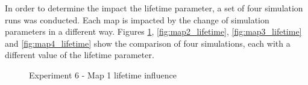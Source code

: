In order to determine the impact the lifetime parameter, a set of four simulation runs was conducted.
Each map is impacted by the change of simulation parameters in a different way.
Figures \ref{fig:map1_lifetime}, \ref{fig:map2_lifetime}, \ref{fig:map3_lifetime} and \ref{fig:map4_lifetime} show the comparison of four simulations, each with a different value of the lifetime parameter.

\begin{figure}[H]
    \centering

    \hspace*{\fill}

    \hspace*{\fill}

    \caption{Experiment 6 - Map 1 lifetime influence}\label{fig:map1_lifetime}
\end{figure}

